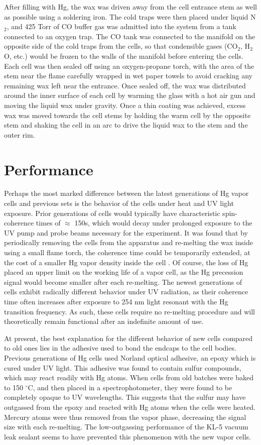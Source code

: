\documentclass [10pt, twoside] {uwthesis}[2012/04/02]
\begin{document}
After filling with Hg, the wax was driven away from the cell entrance stem as well as possible using a soldering iron. The cold traps were then placed under liquid N$_2$, and 425 Torr of CO buffer gas was admitted into the system from a tank connected to an oxygen trap. The CO tank was connected to the manifold on the opposite side of the cold traps from the cells, so that condensible gases (CO$_2$, H$_2$O, etc.) would be frozen to the walls of the manifold before entering the cells. Each cell was then sealed off using an oxygen-propane torch, with the area of the stem near the flame carefully wrapped in wet paper towels to avoid cracking any remaining wax left near the entrance. Once sealed off, the wax was distributed around the inner surface of each cell by warming the glass with a hot air gun and moving the liquid wax under gravity. Once a thin coating was achieved, excess wax was moved towards the cell stems by holding the warm cell by the opposite stem and shaking the cell in an arc to drive the liquid wax to the stem and the outer rim. 
 
\section{Performance}
Perhaps the most marked difference between the latest generations of Hg vapor cells and previous sets is the behavior of the cells under heat and UV light exposure. Prior generations of cells would typically have characteristic spin-coherence times of $\approx$ 150s, which would decay under prolonged exposure to the UV pump and probe beams necessary for the experiment. It was found that by periodically removing the cells from the apparatus and re-melting the wax inside using a small flame torch, the coherence time could be temporarily extended, at the cost of a smaller Hg vapor density inside the cell \cite{Swallows}\cite{Griffith}. Of course, the loss of Hg placed an upper limit on the working life of a vapor cell, as the Hg precession signal would become smaller after each re-melting. The newest generations of cells exhibit radically different behavior under UV radiation, as their coherence time often increases after exposure to 254 nm light resonant with the Hg transition frequency. As such, these cells require no re-melting procedure and will theoretically remain functional after an indefinite amount of use. 

At present, the best explanation for the different behavior of new cells compared to old ones lies in the adhesive used to bond the endcaps to the cell bodies. Previous generations of Hg cells used Norland optical adhesive, an epoxy which is cured under UV light. This adhesive was found to contain sulfur compounds, which may react readily with Hg atoms. When cells from old batches were baked to 150 $^{\circ}$C, and then placed in a spectrophotometer, they were found to be completely opaque to UV wavelengths. This suggests that the sulfur may have outgassed from the epoxy and reacted with Hg atoms when the cells were heated. Mercury atoms were thus removed from the vapor phase, decreasing the signal size with each re-melting. The low-outgassing performance of the KL-5 vacuum leak sealant seems to have prevented this phenomenon with the new vapor cells.
\end{document}
